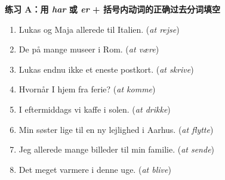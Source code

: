 
\textbf{练习 A：用 \textit{har} 或 \textit{er} + 括号内动词的正确过去分词填空}
\begin{enumerate}
  \item Lukas og Maja \underline{\hspace{1.4cm}} allerede \underline{\hspace{2.2cm}} til Italien. (\textit{at rejse})
  \item De \underline{\hspace{1.4cm}} \underline{\hspace{2.2cm}} på mange museer i Rom. (\textit{at være})
  \item Lukas \underline{\hspace{1.4cm}} endnu ikke \underline{\hspace{2.2cm}} et eneste postkort. (\textit{at skrive})
  \item Hvornår \underline{\hspace{1.4cm}} I \underline{\hspace{2.2cm}} hjem fra ferie? (\textit{at komme})
  \item I eftermiddags \underline{\hspace{1.4cm}} vi \underline{\hspace{2.2cm}} kaffe i solen. (\textit{at drikke})
  \item Min søster \underline{\hspace{1.4cm}} lige \underline{\hspace{2.2cm}} til en ny lejlighed i Aarhus. (\textit{at flytte})
  \item Jeg \underline{\hspace{1.4cm}} allerede \underline{\hspace{2.2cm}} mange billeder til min familie. (\textit{at sende})
  \item Det \underline{\hspace{1.4cm}} \underline{\hspace{2.2cm}} meget varmere i denne uge. (\textit{at blive})
\end{enumerate}

